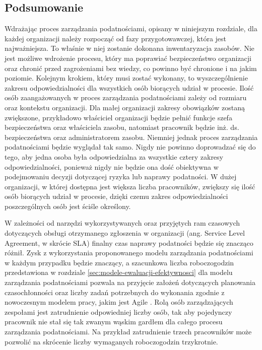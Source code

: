 \subsection{Podsumowanie}
Wdrażając proces zarządzania podatnościami, opisany w niniejszym rozdziale, dla każdej organizacji należy rozpocząć od fazy przygotowawczej, która jest najważniejsza. To właśnie w niej zostanie dokonana inwentaryzacja zasobów. Nie jest możliwe wdrożenie procesu, który ma poprawiać bezpieczeństwo organizacji oraz chronić przed zagrożeniami bez wiedzy, co powinno być chronione i na jakim poziomie. Kolejnym krokiem, który musi zostać wykonany, to wyszczególnienie zakresu odpowiedzialności dla wszystkich osób biorących udział w procesie. Ilość osób zaangażowanych w proces zarządzania podatnościami zależy od rozmiaru oraz kontekstu organizacji. Dla małej organizacji zakresy obowiązków zostaną zwiększone, przykładowo właściciel organizacji będzie pełnić funkcje szefa bezpieczeństwa oraz właściciela zasobu, natomiast pracownik będzie inż. ds. bezpieczeństwa oraz administratorem zasobu. Niemniej jednak proces zarządzania podatnościami będzie wyglądał tak samo. Nigdy nie powinno doprowadzać się do tego, aby jedna osoba była odpowiedzialna za wszystkie cztery zakresy odpowiedzialności, ponieważ nigdy nie będzie ona dość obiektywna w podejmowaniu decyzji dotyczącej ryzyka lub naprawy podatności. W dużej organizacji, w której dostępna jest większa liczba pracowników, zwiększy się ilość osób biorących udział w procesie, dzięki czemu zakres odpowiedzialności poszczególnych osób jest ściśle określony.

\bigbreak
W zależności od narzędzi wykorzystywanych oraz przyjętych ram czasowych dotyczących obsługi otrzymanego zgłoszenia w organizacji (ang. Service Level Agreement, w skrócie SLA) finalny czas naprawy podatności będzie się znacząco różnił. Zysk z wykorzystania proponowanego modelu zarządzania podatnościami w każdym przypadku będzie znaczący, a szacunkowa liczba roboczogodzin przedstawiona w rozdziale \ref{sec:modele-ewaluacji-efektywnosci} dla modelu zarządzania podatnościami pozwala na przyjęcie założeń dotyczących planowania czasochłonności oraz liczby zadań potrzebnych do wykonania zgodnie z nowoczesnym modelem pracy, jakim jest Agile \cite{alqudah2016review}. Rolą osób zarządzających zespołami jest zatrudnienie odpowiedniej liczby osób, tak aby pojedynczy pracownik nie stał się tak zwanym wąskim gardłem dla całego procesu zarządzania podatnościami. Na przykład zatrudnienie trzech pracowników może pozwolić na skrócenie liczby wymaganych roboczogodzin trzykrotnie. 

